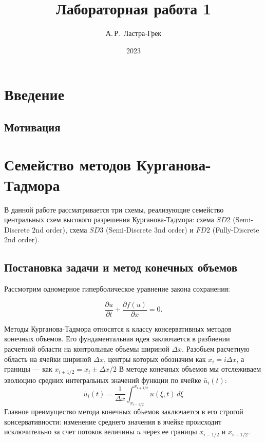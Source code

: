 \documentclass[12pt, a4paper]{article}
\title{Лабораторная работа 1}
\author{А.\,Р.~Ластра-Грек}
\date{2023}
\theoremstyle{gostdef}
\begin{document}
	
	\tableofcontents
	
	\newpage
	
	\section{Введение}
	\subsection{Мотивация}
	
	\newpage
	
	\section{Семейство методов Курганова-Тадмора}
	
	В данной работе рассматривается три схемы, реализующие семейство центральных схем высокого разрешения Курганова-Тадмора: схема $SD2$ (Semi-Discrete $2$nd order), схема $SD3$ (Semi-Discrete $3$nd order) и $FD2$ (Fully-Discrete $2$nd order).
	
	\subsection{Постановка задачи и метод конечных объемов}
	
	Рассмотрим одномерное гиперболическое уравнение закона сохранения:
	
	\[
	\frac{\partial u}{\partial t} + \frac{\partial f(u)}{\partial x} = 0.
	\]
	
	Методы Курганова-Тадмора относятся к классу консервативных методов конечных объемов.
	Его фундаментальная идея заключается в разбиении расчетной области на контрольные объемы шириной $\Delta x$.
	Разобьем расчетную область на ячейки шириной $\Delta x$, центры которых обозначим как $x_i = i \Delta x$, а границы --- как $x_{i \pm 1/2} = x_i \pm \Delta x/2$
	В методе конечных объемов мы отслеживаем эволюцию средних интегральных значений функции по ячейке $\bar{u}_i(t)$:
	\[
	\bar{u}_i(t) = \frac{1}{\Delta x} \int_{x_{i-1/2}}^{x_{i+1/2}} u(\xi, t) \, d\xi
	\]
	Главное преимущество метода конечных объемов заключается в его строгой консервативности: изменение среднего значения в ячейке происходит исключительно за счет потоков величины $u$ через ее границы $x_{i-1/2}$ и $x_{i+1/2}$.
	
\end{document}
